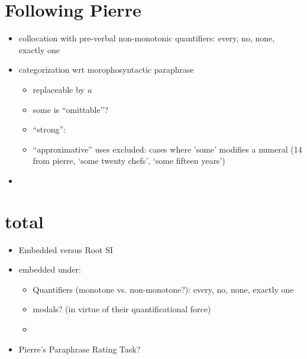 \section{Following Pierre}


\begin{itemize}
	\item collocation with pre-verbal non-monotonic quantifiers: every, no, none, exactly one
	\item categorization wrt morophosyntactic paraphrase
		\begin{itemize}
			\item replaceable by \emph{a}
			\item some is ``omittable''?
			\item ``strong'': 
			\item ``approximative'' uses excluded: cases where 'some' modifies a numeral (14 from pierre, `some twenty chefs', `some fifteen years')
		\end{itemize}
	\item 
\end{itemize}

\section{total}

\begin{itemize}
	\item Embedded versus Root SI
	\item embedded under:
		\begin{itemize}
			\item Quantifiers (monotone vs. non-monotone?): every, no, none, exactly one
			\item modals? (in virtue of their quantificational force)
			\item 
		\end{itemize}
	\item Pierre's Paraphrase Rating Task?
\end{itemize}

